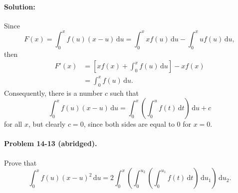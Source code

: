 \documentclass{article}
\begin{document}
\paragraph{Solution:} Since \begin{equation*}
  F(x) = \int_0^x f(u)(x - u) \,\mathrm{d}u
  = \int_0^x xf(u) \,\mathrm{d}u - \int_0^x uf(u) \,\mathrm{d}u,
\end{equation*} then \begin{align*}
  F'(x) &= \left[xf(x) + \int_0^x f(u) \,\mathrm{d}u\right] - xf(x) \\
    &= \int_0^x f(u) \,\mathrm{d}u.
\end{align*} Consequently, there is a number $c$ such that \begin{equation*}
\int_0^x f(u)(x - u) \,\mathrm{d}u
= \int_0^x \left(\int_0^u f(t) \,\mathrm{d}t\right) \,\mathrm{d}u + c
\end{equation*} for all $x$, but clearly $c = 0$, since both sides are equal to
0 for $x = 0$.

\paragraph{Problem 14-13 (abridged).} Prove that \begin{equation*}
  \int_0^x f(u)(x - u)^2 \,\mathrm{d}u
  = 2\int_0^x \left(\int_0^{u_2} \left(\int_0^{u_1} f(t) \,\mathrm{d}t\right)
    \,\mathrm{d}u_1\right) \,\mathrm{d}u_2.
\end{equation*}
\end{document}
